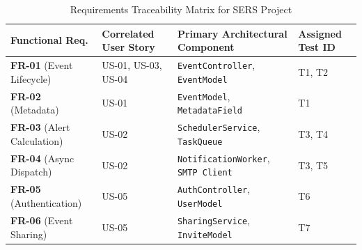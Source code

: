\begin{table}[htbp]
    \centering
    \renewcommand{\arraystretch}{1.5} %
    \begin{tabularx}{\textwidth}{
        >{\raggedright\arraybackslash}p{2.8cm}
        >{\raggedright\arraybackslash}p{3cm}
        >{\raggedright\arraybackslash}X
        >{\raggedright\arraybackslash}p{2cm}
        }
        \toprule
        \rowcolor{gray!25} %
        \textbf{Functional Req.}                    & \textbf{Correlated User Story} & \textbf{Primary Architectural Component}          & \textbf{Assigned Test ID} \\
        \midrule

        \textbf{FR-01} \newline (Event Lifecycle)   & US-01, US-03, US-04            & \texttt{EventController}, \texttt{EventModel}     & T1, T2                    \\

        \textbf{FR-02} \newline (Metadata)          & US-01                          & \texttt{EventModel}, \texttt{MetadataField}       & T1                        \\

        \textbf{FR-03} \newline (Alert Calculation) & US-02                          & \texttt{SchedulerService}, \texttt{TaskQueue}     & T3, T4                    \\

        \textbf{FR-04} \newline (Async Dispatch)    & US-02                          & \texttt{NotificationWorker}, \texttt{SMTP Client} & T3, T5                    \\

        \textbf{FR-05} \newline (Authentication)    & US-05                          & \texttt{AuthController}, \texttt{UserModel}       & T6                        \\

        \textbf{FR-06} \newline (Event Sharing)     & US-05                          & \texttt{SharingService}, \texttt{InviteModel}     & T7                        \\

        \bottomrule
    \end{tabularx}
    \caption{Requirements Traceability Matrix for SERS Project}
    \label{tab:rtm}
\end{table}